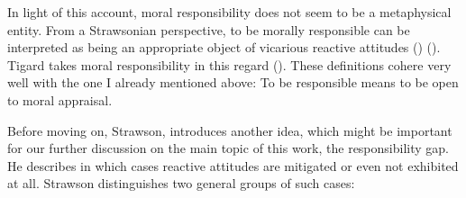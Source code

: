 \documentclass{article}
\begin{document}
In light of this account, moral responsibility does not seem to be a metaphysical entity.
From a Strawsonian perspective, to be morally responsible can be interpreted as
being an appropriate object of vicarious reactive attitudes
(\cite[p.3]{SmithVickers2021}) (\cite[p.175]{Matthias_2004}). Tigard takes moral
responsibility in this regard  (\cite[p.3]{Tigard_2020}). 
These definitions cohere very well with the one I already mentioned above: To be
responsible means to be open to moral appraisal.





Before moving on, Strawson, introduces another idea, which might be important for
our further discussion on the main topic of this work, the responsibility gap.
He describes in which cases reactive attitudes are mitigated or even not
exhibited at all. Strawson distinguishes two general groups of such cases:
\end{document}
